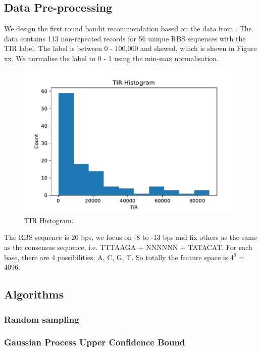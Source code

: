 \documentclass{article}
\begin{document}
\subsection{Data Pre-processing}

We design the first round bandit recommendation based on the data from \textcite{jervis2018machine}. The data contains 113 non-repeated records for 56 unique RBS sequences with the TIR label. The label is between 0 - 100,000 and skewed, which is shown in Figure xx. We normalise the label to 0 - 1 using the min-max normalisation. 

\begin{figure}[t]
    \centering
    \includegraphics[scale=0.7]{plots/TIR_histogram.pdf}
    \caption{TIR Histogram.}
    \label{fig: TIR Histogram.}
\end{figure}

The RBS sequence is 20 bps, we focus on -8 to -13 bps and fix others as the same as the consensus sequence, i.e. TTTAAGA + NNNNNN + TATACAT. For each base, there are 4 possibilities: A, C, G, T. So totally the feature space is $4^6$ = 4096.

\subsection{Algorithms}

\subsubsection{Random sampling}

\subsubsection{Gaussian Process Upper Confidence Bound}
\end{document}
